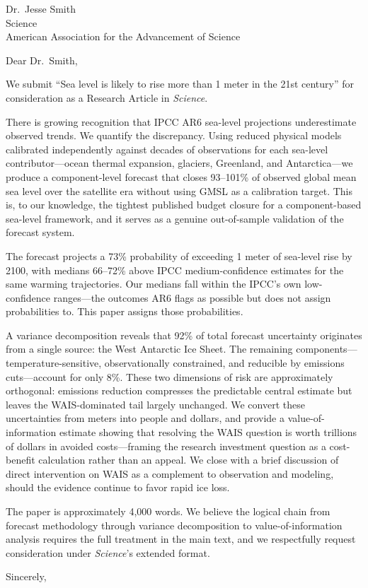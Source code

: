 \documentclass[12pt]{letter}
\begin{document}
\begin{letter}{Dr.\ Jesse Smith\\Science\\American Association for the Advancement of Science}

\opening{Dear Dr.\ Smith,}

We submit ``Sea level is likely to rise more than 1 meter in the 21st century'' for consideration as a Research Article in \textit{Science}.

There is growing recognition that IPCC AR6 sea-level projections underestimate observed trends. We quantify the discrepancy. Using reduced physical models calibrated independently against decades of observations for each sea-level contributor---ocean thermal expansion, glaciers, Greenland, and Antarctica---we produce a component-level forecast that closes 93--101\% of observed global mean sea level over the satellite era without using GMSL as a calibration target. This is, to our knowledge, the tightest published budget closure for a component-based sea-level framework, and it serves as a genuine out-of-sample validation of the forecast system.

The forecast projects a 73\% probability of exceeding 1 meter of sea-level rise by 2100, with medians 66--72\% above IPCC medium-confidence estimates for the same warming trajectories. Our medians fall within the IPCC's own low-confidence ranges---the outcomes AR6 flags as possible but does not assign probabilities to. This paper assigns those probabilities.

A variance decomposition reveals that 92\% of total forecast uncertainty originates from a single source: the West Antarctic Ice Sheet. The remaining components---temperature-sensitive, observationally constrained, and reducible by emissions cuts---account for only 8\%. These two dimensions of risk are approximately orthogonal: emissions reduction compresses the predictable central estimate but leaves the WAIS-dominated tail largely unchanged. We convert these uncertainties from meters into people and dollars, and provide a value-of-information estimate showing that resolving the WAIS question is worth trillions of dollars in avoided costs---framing the research investment question as a cost-benefit calculation rather than an appeal. We close with a brief discussion of direct intervention on WAIS as a complement to observation and modeling, should the evidence continue to favor rapid ice loss.

The paper is approximately 4,000 words. We believe the logical chain from forecast methodology through variance decomposition to value-of-information analysis requires the full treatment in the main text, and we respectfully request consideration under \textit{Science}'s extended format.

\closing{Sincerely,}

\end{letter}
\end{document}

